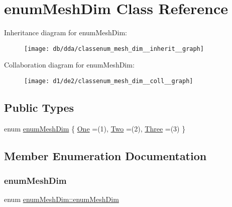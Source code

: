 \hypertarget{classenum_mesh_dim}{}\section{enum\+Mesh\+Dim Class Reference}
\label{classenum_mesh_dim}


Inheritance diagram for enum\+Mesh\+Dim\+:
\nopagebreak
\begin{figure}[H]
\begin{center}
\leavevmode
\texttt{[image: db/dda/classenum\_mesh\_dim\_\_inherit\_\_graph]}
\end{center}
\end{figure}


Collaboration diagram for enum\+Mesh\+Dim\+:
\nopagebreak
\begin{figure}[H]
\begin{center}
\leavevmode
\texttt{[image: d1/de2/classenum\_mesh\_dim\_\_coll\_\_graph]}
\end{center}
\end{figure}
\subsection*{Public Types}
\begin{DoxyCompactItemize}
\item 
enum \hyperlink{classenum_mesh_dim_a5a67c42a0c79eab8e32b9c613507a672}{enum\+Mesh\+Dim} \{ \hyperlink{classenum_mesh_dim_a5a67c42a0c79eab8e32b9c613507a672a459e0997a41df310edd45a87176a6f41}{One} =(1), 
\hyperlink{classenum_mesh_dim_a5a67c42a0c79eab8e32b9c613507a672af027c134a34d29d25d620ecb88abf423}{Two} =(2), 
\hyperlink{classenum_mesh_dim_a5a67c42a0c79eab8e32b9c613507a672a4e749d96848830bd18200e5055f83634}{Three} =(3)
 \}
\end{DoxyCompactItemize}


\subsection{Member Enumeration Documentation}
\mbox{\label{classenum_mesh_dim_a5a67c42a0c79eab8e32b9c613507a672}} 
\subsubsection{\texorpdfstring{enum\+Mesh\+Dim}{enumMeshDim}}
{\footnotesize\ttfamily enum \hyperlink{classenum_mesh_dim_a5a67c42a0c79eab8e32b9c613507a672}{enum\+Mesh\+Dim\+::enum\+Mesh\+Dim}}

